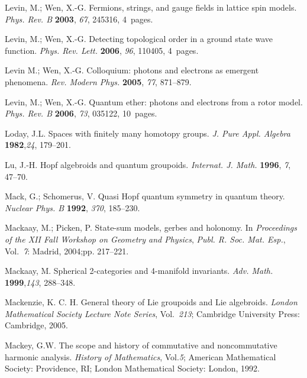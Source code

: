 \documentclass[12pt]{article}
\theoremstyle{plain}
\theoremstyle{definition}
\numberwithin{equation}{section}
\begin{document}
\begin{thebibliography}{199}
Levin, M.; Wen, X.-G.  Fermions, strings, and gauge fields in lattice spin models.  {\em Phys. Rev. B} {\bf 2003}, {\em 67}, 245316, 4~pages. %

Levin, M.; Wen, X.-G.  Detecting topological order in a ground state wave function. {\em Phys. Rev. Lett.} {\bf 2006}, {\em 96}, 110405, 4~pages. %

Levin M.; Wen, X.-G. Colloquium: photons and electrons as emergent phenomena. {\em Rev. Modern Phys.} {\bf 2005}, {\em 77}, 871--879. %

Levin, M.; Wen, X.-G. Quantum ether: photons and electrons from a rotor model. {\em Phys. Rev. B} {\bf 2006}, {\em 73}, 035122, 10~pages. %

Loday, J.L. Spaces with finitely many homotopy groups. {\em J. Pure Appl. Algebra} {\bf 1982},{\em 24}, 179--201.

Lu, J.-H.  Hopf algebroids and quantum groupoids. {\em Internat. J. Math.} {\bf 1996}, {\em 7}, 47--70. 

Mack, G.; Schomerus, V.  Quasi Hopf quantum symmetry in quantum theory. {\em Nuclear Phys. B} {\bf 1992}, {\em 370}, 185--230.

Mackaay, M.; Picken, P.  State-sum models, gerbes and holonomy.  In {\em Proceedings of the XII Fall Workshop on Geometry and Physics}, {\em Publ. R. Soc. Mat. Esp.},  Vol.~{\em 7}: Madrid, 2004;pp. 217--221.

Mackaay, M.  Spherical 2-categories and 4-manifold invariants. \emph{Adv. Math.} {\bf 1999},{\em 143}, 288--348. 

Mackenzie, K. C. H.  General theory of Lie groupoids and Lie algebroids. {\em London Mathematical Society Lecture Note Series}, Vol.~{\em 213}; Cambridge University Press: Cambridge, 2005.

Mackey, G.W.  The scope and history of commutative and noncommutative harmonic analysis. {\em History of Mathematics}, Vol.{\em 5}; American Mathematical Society: Providence, RI; London Mathematical Society: London, 1992.


\end{thebibliography}
\end{document}
